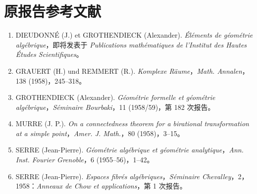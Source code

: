 \section*{原报告参考文献}
\begin{enumerate}
\item[1.]\label{fga3.i-bib-1} DIEUDONNÉ (J.) et GROTHENDIECK (Alexander). \emph{Éléments de géométrie algébrique}，即将发表于 \emph{Publications mathématiques de l'Institut des Hautes Études Scientifiques}。
\item[2.]\label{fga3.i-bib-2} GRAUERT (H.) und REMMERT (R.). \emph{Komplexe Räume}，\emph{Math. Annalen}，138 (1958)，245--318。
\item[3.]\label{fga3.i-bib-3} GROTHENDIECK (Alexander). \emph{Géométrie formelle et géométrie algébrique}，\emph{Séminaire Bourbaki}，11 (1958/59)，第 182 次报告。
\item[4.]\label{fga3.i-bib-4} MURRE (J. P.). \emph{On a connectedness theorem for a birational transformation at a simple point}，\emph{Amer. J. Math.}，80 (1958)，3--15。
\item[5.]\label{fga3.i-bib-5} SERRE (Jean-Pierre). \emph{Géométrie algébrique et géométrie analytique}，\emph{Ann. Inst. Fourier Grenoble}，6 (1955--56)，1--42。
\item[6.]\label{fga3.i-bib-6} SERRE (Jean-Pierre). \emph{Espaces fibrés algébriques}，\emph{Séminaire Chevalley}，2，1958：\emph{Anneaux de Chow et applications}，第 1 次报告。
\end{enumerate}


\clearpage
\setcounter{chapter}{0}
\renewcommand\fgaAnchorPrefix{fga3.ii}

